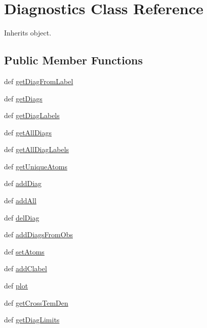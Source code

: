 \hypertarget{classpyneb_1_1core_1_1diags_1_1_diagnostics}{\section{Diagnostics Class Reference}
\label{classpyneb_1_1core_1_1diags_1_1_diagnostics}
}


Inherits object.

\subsection*{Public Member Functions}
\begin{DoxyCompactItemize}
\item 
def \hyperlink{classpyneb_1_1core_1_1diags_1_1_diagnostics_ac124e7f5b159425ac15918d9fb1fad01}{get\-Diag\-From\-Label}
\item 
def \hyperlink{classpyneb_1_1core_1_1diags_1_1_diagnostics_a434ab4a41edaea673f4289283f1db85f}{get\-Diags}
\item 
def \hyperlink{classpyneb_1_1core_1_1diags_1_1_diagnostics_a94dadcd8c5a63fdf622df858420ac262}{get\-Diag\-Labels}
\item 
def \hyperlink{classpyneb_1_1core_1_1diags_1_1_diagnostics_a14ed62568903b87356892da4ebfc49b6}{get\-All\-Diags}
\item 
def \hyperlink{classpyneb_1_1core_1_1diags_1_1_diagnostics_ac8b6dd3073294e74bc54e03a04a14071}{get\-All\-Diag\-Labels}
\item 
def \hyperlink{classpyneb_1_1core_1_1diags_1_1_diagnostics_a535c190615ab1b9014311e43014a929c}{get\-Unique\-Atoms}
\item 
def \hyperlink{classpyneb_1_1core_1_1diags_1_1_diagnostics_a5ef93e4268f3ac7fc1f1215225d29347}{add\-Diag}
\item 
def \hyperlink{classpyneb_1_1core_1_1diags_1_1_diagnostics_a2791badccdeae3c55af4d8d94552c1e8}{add\-All}
\item 
def \hyperlink{classpyneb_1_1core_1_1diags_1_1_diagnostics_a60f87567624b2ebc5405dadff8faf566}{del\-Diag}
\item 
def \hyperlink{classpyneb_1_1core_1_1diags_1_1_diagnostics_a597aca4e2c9e330b2675301e060495c1}{add\-Diags\-From\-Obs}
\item 
def \hyperlink{classpyneb_1_1core_1_1diags_1_1_diagnostics_a05d34ad0c32a19f5f3476761f78b41e9}{set\-Atoms}
\item 
def \hyperlink{classpyneb_1_1core_1_1diags_1_1_diagnostics_aeac4bfc9d8794f4cc4bb6a705536facc}{add\-Clabel}
\item 
def \hyperlink{classpyneb_1_1core_1_1diags_1_1_diagnostics_ab0394ec3bced7aafedc829f80d3d95f5}{plot}
\item 
def \hyperlink{classpyneb_1_1core_1_1diags_1_1_diagnostics_aba2575230391bf6d96ef2a5dbae6853f}{get\-Cross\-Tem\-Den}
\item 
def \hyperlink{classpyneb_1_1core_1_1diags_1_1_diagnostics_af71026e11d0e1fb6cd6c91b05e12fa8c}{get\-Diag\-Limits}
\end{DoxyCompactItemize}
